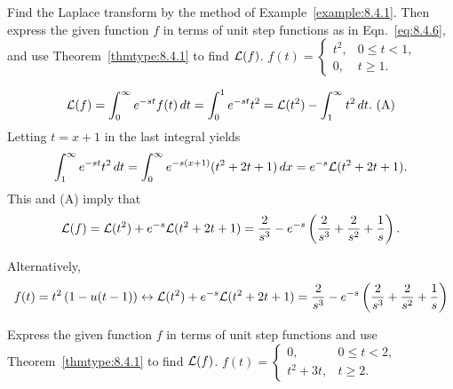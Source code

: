 \documentclass{ximera}
\begin{document}
 \begin{problem}\label{exer:8.4.6}
Find the Laplace transform by
the method of Example~\ref{example:8.4.1}. Then express the given function
$f$ in terms of unit step functions as in Eqn.~\eqref{eq:8.4.6}, and use
Theorem~\ref{thmtype:8.4.1} to find ${\cal L}(f)$.
$f(t)=\left\{\begin{array}{cl} t^2,& 0\le
t<1,\\ 0,&t\ge1.\end{array}\right.$

\begin{solution}
$$
{\cal L}(f)  =\int_0^\infty e^{-st}f(t)\, dt
 =\int_0^1 e^{-st}t^2={\cal L}(t^2)-\int_1^\infty t^2\,dt.
\text{ (A)}
$$
Letting $t=x+1$  in the last integral yields
$$
\int_1^\infty e^{-st}t^2\,dt=\int_0^\infty e^{-s(x+1)}(t^2+2t+1)\,dx
 =e^{-s}{\cal L}(t^2+2t+1).
$$
This and (A) imply that
$$
{\cal L}(f)={\cal L}(t^2)+e^{-s}{\cal L} (t^2+2t+1)
=\frac{2}{s^3}-e^{-s}\left(\frac{2}{s^3}+\frac{2}{s^2}+\frac{1}{s}\right).
$$

Alternatively,
$$
f(t)=t^2\left(1-u(t-1)\right)\leftrightarrow
{\cal L}(t^2)+e^{-s}{\cal L} (t^2+2t+1)=
\frac{2}{s^3}-e^{-s}\left(\frac{2}{s^3}+\frac{2}{s^2}+\frac{1}{s}\right)
$$
\end{solution}
\end{problem}

\begin{problem}\label{exer:8.4.7}
Express the
given function $f$ in terms of unit step functions
 and use Theorem~\ref{thmtype:8.4.1} to find ${\cal L}(f)$.
$f(t)=\left\{\begin{array}{cl} 0, &0\le
t<2,\\ t^2+3t,&t\ge2.\end{array}\right.$
\end{problem}
\end{document}
